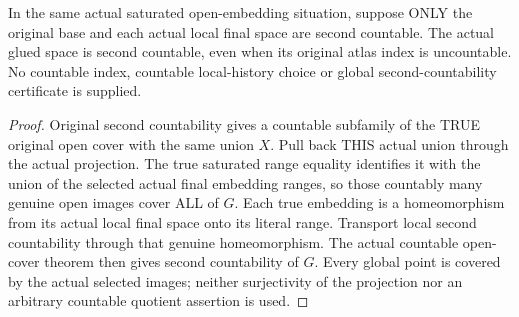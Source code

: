 \begin{theorem}
\label{hir:terminal-atlas-actual-saturated-projection-second-countable}
\leanok
{}
In the same actual saturated open-embedding situation, suppose ONLY the
original base and each actual local final space are second countable. The
actual glued space is second countable, even when its original atlas index
is uncountable. No countable index, countable local-history choice or global
second-countability certificate is supplied.
\end{theorem}
\begin{proof}
Original second countability gives a countable subfamily of the TRUE
original open cover with the same union $X$. Pull back THIS actual union
through the actual projection. The true saturated range equality identifies
it with the union of the selected actual final embedding ranges, so those
countably many genuine open images cover ALL of $G$. Each true embedding
is a homeomorphism from its actual local final space onto its literal range.
Transport local second countability through that genuine homeomorphism.
The actual countable open-cover theorem then gives second countability of
$G$. Every global point is covered by the actual selected images; neither
surjectivity of the projection nor an arbitrary countable quotient assertion
is used.
\end{proof}

